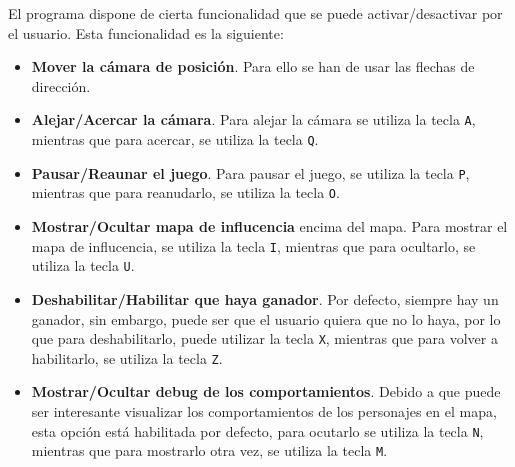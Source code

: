 El programa dispone de cierta funcionalidad que se puede activar/desactivar por el usuario. Esta funcionalidad es la siguiente:
\begin{itemize}
 \item \textbf{Mover la cámara de posición}. Para ello se han de usar las flechas de dirección.
 \item \textbf{Alejar/Acercar la cámara}. Para alejar la cámara se utiliza la tecla \texttt{A}, mientras que para acercar, se utiliza la tecla \texttt{Q}.
 \item \textbf{Pausar/Reaunar el juego}. Para pausar el juego, se utiliza la tecla \texttt{P}, mientras que para reanudarlo, se utiliza la tecla \texttt{O}.
 \item \textbf{Mostrar/Ocultar mapa de influcencia} encima del mapa. Para mostrar el mapa de influcencia, se utiliza la tecla \texttt{I}, mientras que para ocultarlo, se utiliza la tecla \texttt{U}.
 \item \textbf{Deshabilitar/Habilitar que haya ganador}. Por defecto, siempre hay un ganador, sin embargo, puede ser que el usuario quiera que no lo haya, por lo que para deshabilitarlo, puede utilizar la tecla \texttt{X}, mientras que para volver a habilitarlo, se utiliza la tecla \texttt{Z}.
 \item \textbf{Mostrar/Ocultar debug de los comportamientos}. Debido a que puede ser interesante visualizar los comportamientos de los personajes en el mapa, esta opción está habilitada por defecto, para ocutarlo se utiliza la tecla \texttt{N}, mientras que para mostrarlo otra vez, se utiliza la tecla \texttt{M}.
\end{itemize}
